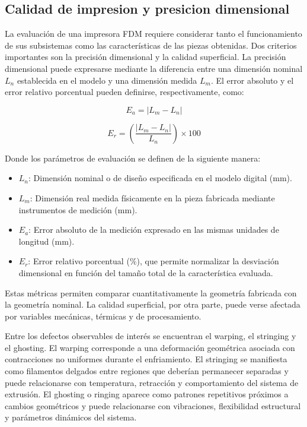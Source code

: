 \subsection{Calidad de impresion y presicion dimensional}
La evaluación de una impresora FDM requiere considerar tanto el funcionamiento de sus subsistemas como las características de las piezas obtenidas. Dos criterios importantes son la precisión dimensional y la calidad superficial.
La precisión dimensional puede expresarse mediante la diferencia entre una dimensión nominal $L_n$ establecida en el modelo y una dimensión medida $L_m$. El error absoluto y el error relativo porcentual pueden definirse, respectivamente, como:

\begin{equation}
    E_a = |L_m - L_n|
    \label{eq:error_absoluto}
\end{equation}

\begin{equation}
    E_r = \left( \frac{|L_m - L_n|}{L_n} \right) \times 100
    \label{eq:error_relativo}
\end{equation}

Donde los parámetros de evaluación se definen de la siguiente manera:
\begin{itemize}
    \item $L_n$: Dimensión nominal o de diseño especificada en el modelo digital ($\text{mm}$).
    \item $L_m$: Dimensión real medida físicamente en la pieza fabricada mediante instrumentos de medición ($\text{mm}$).
    \item $E_a$: Error absoluto de la medición expresado en las mismas unidades de longitud ($\text{mm}$).
    \item $E_r$: Error relativo porcentual ($\%$), que permite normalizar la desviación dimensional en función del tamaño total de la característica evaluada.
\end{itemize}


Estas métricas permiten comparar cuantitativamente la geometría fabricada con la geometría nominal. La calidad superficial, por otra parte, puede verse afectada por variables mecánicas, térmicas y de procesamiento.

Entre los defectos observables de interés se encuentran el warping, el stringing y el ghosting. El warping corresponde a una deformación geométrica asociada con contracciones no uniformes durante el enfriamiento. El stringing se manifiesta como filamentos delgados entre regiones que deberían permanecer separadas y puede relacionarse con temperatura, retracción y comportamiento del sistema de extrusión. El ghosting o ringing aparece como patrones repetitivos próximos a cambios geométricos y puede relacionarse con vibraciones, flexibilidad estructural y parámetros dinámicos del sistema.

